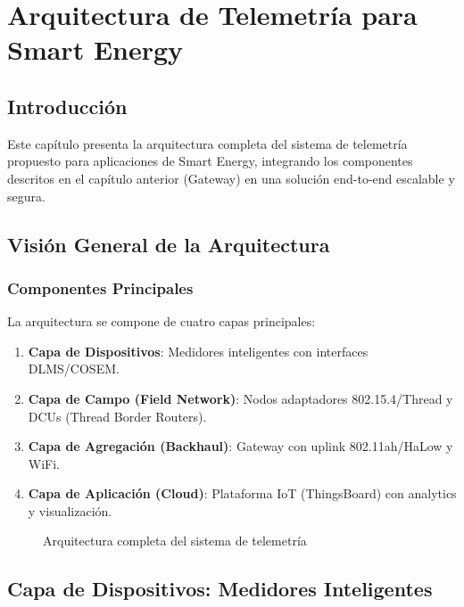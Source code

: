 ﻿\chapter{Arquitectura de Telemetría para Smart Energy}

\section{Introducción}

Este capítulo presenta la arquitectura completa del sistema de telemetría propuesto para aplicaciones de Smart Energy, integrando los componentes descritos en el capítulo anterior (Gateway) en una solución end-to-end escalable y segura.

\section{Visión General de la Arquitectura}

\subsection{Componentes Principales}

La arquitectura se compone de cuatro capas principales:

\begin{enumerate}
    \item \textbf{Capa de Dispositivos}: Medidores inteligentes con interfaces DLMS/COSEM.
    \item \textbf{Capa de Campo (Field Network)}: Nodos adaptadores 802.15.4/Thread y DCUs (Thread Border Routers).
    \item \textbf{Capa de Agregación (Backhaul)}: Gateway con uplink 802.11ah/HaLow y WiFi.
    \item \textbf{Capa de Aplicación (Cloud)}: Plataforma IoT (ThingsBoard) con analytics y visualización.
\end{enumerate}

\begin{figure}[h]
\centering
\caption{Arquitectura completa del sistema de telemetría}
\label{fig:arquitectura-completa}
\end{figure}

\section{Capa de Dispositivos: Medidores Inteligentes}

